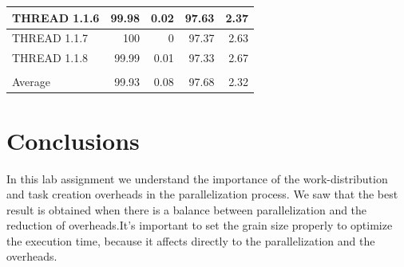 \documentclass{article}
\begin{document}
\begin{table}[h!]
\begin{tabular}{!{\color{black}\vrule}l!{\color{black}\vrule}r!{\color{black}\vrule}r!{\color{black}\vrule}r!{\color{black}\vrule}r!{\color{black}\vrule}}
\hline
THREAD 1.1.6                               & 99.98                                                    & 0.02                                                         & 97.63                                                    & 2.37                                                          \\ 
\hline
THREAD 1.1.7                               & 100                                                      & 0                                                            & 97.37                                                    & 2.63                                                          \\ 
\hline
THREAD 1.1.8                               & 99.99                                                    & 0.01                                                         & 97.33                                                    & 2.67                                                          \\ 
\hline
{}                       &                                      &                                          &                                      &                                           \\ 
\hline
Average                                    & 99.93                                                    & 0.08                                                         & 97.68                                                    & 2.32                                                          \\
\hline
\end{tabular}
\end{table}

\newpage
\section{Conclusions}
\justify
In this lab assignment we understand the importance of the work-distribution and task creation overheads in the parallelization process. We saw that the best result is obtained when there is a balance between parallelization and the reduction of overheads.It's important to set the grain size properly to optimize the execution time, because it affects directly to the parallelization and the overheads.
\end{document}
